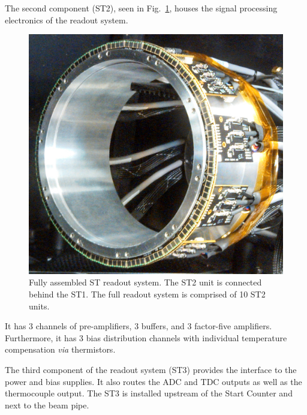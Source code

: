 The second component (ST2), seen in Fig.~\ref{fig:stfullreadout}, houses the signal processing electronics of the readout system.
	\begin{figure}[!htb]
		\centering
		\includegraphics[width=1.0\columnwidth]{design/figs/st_full_readout_v3}
		\caption{Fully assembled ST readout system.  The ST2 unit is connected behind the ST1.  The full readout system is comprised of 10 ST2 units.}
		\label{fig:stfullreadout}
	\end{figure}
It has 3 channels of pre-amplifiers, 3 buffers, and 3 factor-five amplifiers.  Furthermore, it has 3 bias distribution channels with individual temperature compensation \emph{via} thermistors. %

The third component of the readout system (ST3) provides the interface to the power and bias supplies.  It also routes the ADC and TDC outputs as well as the thermocouple output.  The ST3 is installed upstream of the Start Counter and next to the beam pipe.